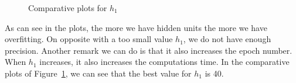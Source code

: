 \documentclass[10pt,a4paper,english]{article}
\begin{document}
\begin{figure}[!h]
    \centering
    \caption{Comparative plots for $h_1$}
    \label{fig:comp-hidden}
\end{figure}
As can see in the plots, the more we have hidden units the more we have overfitting. On opposite with a too small value $h_1$, we do not have enough precision. Another remark we can do is that it also increases the epoch number. When $h_1$ increases, it also increases the computations time.
In the comparative plots of Figure~\ref{fig:comp-hidden}, we can see that the best value for $h_1$ is 40.
\end{document}
